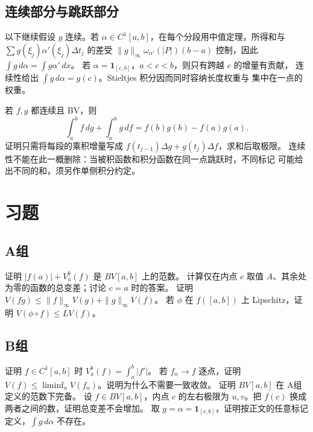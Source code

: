 \subsection{连续部分与跳跃部分}

以下继续假设 \(g\) 连续。若 \(\alpha\in C^1[a,b]\)，在每个分段用中值定理，所得和与
\(\sum g(\xi_j)\alpha'(\xi_j)\Delta t_j\) 的差受
\(\|g\|_\infty\omega_{\alpha'}(|P|)(b-a)\) 控制，因此
\(\int g\,d\alpha=\int g\alpha'\,dx\)。
若 \(\alpha=\mathbf1_{[c,b]}\)，\(a<c<b\)，则只有跨越 \(c\) 的增量有贡献，
连续性给出 \(\int g\,d\alpha=g(c)\)。Stieltjes 积分因而同时容纳长度权重与
集中在一点的权重。

若 \(f,g\) 都连续且 BV，则
\[
 \int_a^bf\,dg+\int_a^bg\,df=f(b)g(b)-f(a)g(a).
\]
证明只需将每段的乘积增量写成
\(f(t_{j-1})\Delta g+g(t_j)\Delta f\)，求和后取极限。
连续性不能在此一概删除：当被积函数和积分函数在同一点跳跃时，不同标记
可能给出不同的和，须另作单侧积分约定。

\section*{习题}
\subsection*{A组}
\begin{enumerate}[label=\textbf{\thechapter.\arabic*.}]
证明 \(|f(a)|+V_a^b(f)\) 是 \(BV[a,b]\) 上的范数。
计算仅在内点 \(c\) 取值 \(A\)、其余处为零的函数的总变差；讨论 \(c=a\) 时的答案。
证明 \(V(fg)\le\|f\|_\infty V(g)+\|g\|_\infty V(f)\)。
若 \(\phi\) 在 \(f([a,b])\) 上 Lipschitz，证明 \(V(\phi\circ f)\le L V(f)\)。
\end{enumerate}
\subsection*{B组}
\begin{enumerate}[label=\textbf{\thechapter.\arabic*.},resume]
证明 \(f\in C^1[a,b]\) 时 \(V_a^b(f)=\int_a^b|f'|\)。
若 \(f_n\to f\) 逐点，证明 \(V(f)\le\liminf_nV(f_n)\)。说明为什么不需要一致收敛。
证明 \(BV[a,b]\) 在 A组定义的范数下完备。
设 \(f\in BV[a,b]\)，内点 \(c\) 的左右极限为 \(u,v\)。把 \(f(c)\) 换成两者之间的数，证明总变差不会增加。
取 \(g=\alpha=\mathbf1_{[c,b]}\)，证明按正文的任意标记定义，\(\int g\,d\alpha\) 不存在。
\end{enumerate}

